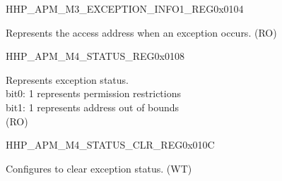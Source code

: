 \begin{register}{H}{HP\_APM\_M3\_EXCEPTION\_INFO1\_REG}{0x0104}\label{regdesc:HPAPMM3EXCEPTIONINFO1REG}
%
\regnewline%
\begin{regdesc}\begin{reglist}
\label{fielddesc:HPAPMM3EXCEPTIONADDR}\item [HP\_APM\_M3\_EXCEPTION\_ADDR] Represents the access address when an exception occurs. (RO)
\end{reglist}\end{regdesc}
\end{register}


\begin{register}{H}{HP\_APM\_M4\_STATUS\_REG}{0x0108}\label{regdesc:HPAPMM4STATUSREG}
%
%
\regnewline%
\begin{regdesc}\begin{reglist}
\label{fielddesc:HPAPMM4EXCEPTIONSTATUS}\item [HP\_APM\_M4\_EXCEPTION\_STATUS] Represents exception status.\\
bit0: 1 represents permission restrictions \\
bit1: 1 represents address out of bounds  \\ (RO)
\end{reglist}\end{regdesc}
\end{register}


\begin{register}{H}{HP\_APM\_M4\_STATUS\_CLR\_REG}{0x010C}\label{regdesc:HPAPMM4STATUSCLRREG}
%
%
\regnewline%
\begin{regdesc}\begin{reglist}
\label{fielddesc:HPAPMM4EXCEPTIONSTATUSCLR}\item [HP\_APM\_M4\_EXCEPTION\_STATUS\_CLR] Configures to clear exception status. (WT)
\end{reglist}\end{regdesc}
\end{register}


